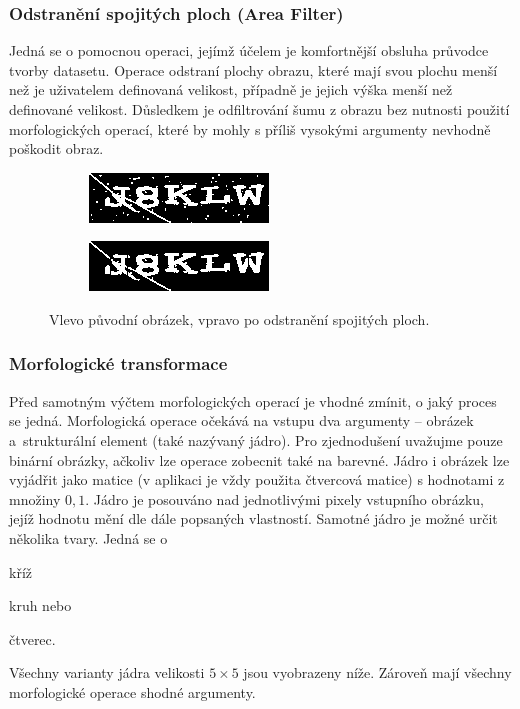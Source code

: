 \documentclass[
  field=ainfp,
  master=true,
  biblatex,
  sourcecodes=false,
  theorems=false,
  glossaries,
  index
]{kidiplom}
\begin{document}
\subsubsection*{Odstranění spojitých ploch (Area Filter)}
Jedná se o pomocnou operaci, jejímž účelem je komfortnější obsluha průvodce tvorby datasetu. Operace odstraní plochy obrazu, které mají svou plochu menší než je uživatelem definovaná velikost, případně je jejich výška menší než definované velikost. Důsledkem je odfiltrování šumu z obrazu bez nutnosti použití morfologických operací, které by mohly s příliš vysokými argumenty nevhodně poškodit obraz.
\begin{figure}[H]
\centering
\begin{subfigure}{.5\textwidth}
  \centering
  \includegraphics[width=.8\linewidth]{images/filter_original.png}
\end{subfigure}%
\begin{subfigure}{.5\textwidth}
  \centering
  \includegraphics[width=.8\linewidth]{images/filter_result.png}
\end{subfigure}
\caption{Vlevo původní obrázek, vpravo po odstranění spojitých ploch.}
\label{fig:inverse_example}
\end{figure}
\subsubsection*{Morfologické transformace}
Před samotným výčtem morfologických operací je vhodné zmínit, o jaký proces se jedná. Morfologická operace očekává na vstupu dva argumenty -- obrázek a~strukturální element (také nazývaný jádro). Pro zjednodušení uvažujme pouze binární obrázky, ačkoliv lze operace zobecnit také na barevné. Jádro i obrázek lze vyjádřit jako matice (v aplikaci je vždy použita čtvercová matice) s hodnotami z množiny $ {0, 1} $. Jádro je posouváno nad jednotlivými pixely vstupního obrázku, jejíž hodnotu mění dle dále popsaných vlastností. Samotné jádro je možné určit několika tvary. Jedná se o 
\begin{enumerate*}[label={\alph*)}]
\item kříž
\item kruh nebo
\item čtverec.
\end{enumerate*}
Všechny varianty jádra velikosti $5 \times 5$ jsou vyobrazeny níže. Zároveň mají všechny morfologické operace shodné argumenty.
\end{document}
